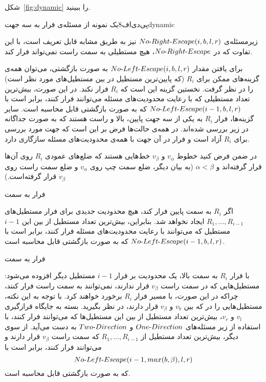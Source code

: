 
شکل~\ref{fig:dynamic} را ببینید.

‌پی‌دی‌اف{8}{یک نمونه از مسئله‌ی فرار به سه جهت}{dynamic}

زیر‌مسئله‌ی $No \mbox{-} Right \mbox{-} Escape(i, b, l, r)$ نیز به طریق مشابه قابل تعریف است، با این تفاوت که در $No \mbox{-} Right \mbox{-} Escape$، هیچ مستطیلی به سمت راست نمی‌تواند فرار کند.


برای یافتن مقدار $No \mbox{-} Left \mbox{-} Escape(i, b, l, r)$ به صورت بازگشتی، می‌توان همه‌ی گزینه‌های ممکن برای $R_{i}$ (که پایین‌ترین مستطیل در بین مستطیل‌های مورد نظر است) را در نظر گرفت. نخستین گزینه این است که $R_{i}$ فرار نکند. در این صورت، بیش‌ترین تعداد مستطیلی که با رعایت محدودیت‌های مسئله می‌توانند فرار کنند، برابر است با $No \mbox{-} Left \mbox{-} Escape(i - 1, b, l, r)$ که به صورت بازگشتی قابل محاسبه است. سایر گزینه‌ها، فرار $R_{i}$ به یکی از سه جهت پایین، بالا و راست هستند که به صورت جداگانه در زیر بررسی شده‌اند. در همه‌ی حالت‌ها فرض بر این است که جهت مورد بررسی برای $R_{i}$ آزاد است و فرار در آن جهت با همه‌ی محدودیت‌های مسئله سازگاری دارد.

در ضمن فرض کنید خطوط $v_{\alpha}$ و $v_{\beta}$ خط‌هایی هستند که ضلع‌های عمودی $R_{i}$ روی آن‌ها قرار گرفته‌اند و $\alpha < \beta$ (به بیان دیگر، ضلع سمت چپ روی $v_{\alpha}$ و ضلع سمت راست روی $v_{\beta}$ قرار گرفته‌است.)


 فرار به سمت 

اگر $R_{i}$ به سمت پایین فرار کند، هیچ محدودیت جدیدی برای فرار مستطیل‌های $R_{1}, \ldots, R_{i - 1}$ ایجاد نخواهد شد. بنابراین، بیش‌ترین تعداد مستطیل از بین این $i - 1$ مستطیل که می‌توانند با رعایت محدودیت‌های مسئله فرار کنند، برابر است با $No \mbox{-} Left \mbox{-} Escape(i - 1, b, l, r)$ که به صورت بازگشتی قابل محاسبه است.

 فرار به سمت 

با فرار $R_{i}$ به سمت بالا، یک محدودیت بر فرار $i - 1$ مستطیل دیگر افزوده می‌شود: مستطیل‌هایی که در سمت راست $v_{\beta}$ قرار ندارند، نمی‌توانند به سمت راست فرار کنند، چراکه در این صورت، با مسیر فرار $R_{i}$ برخورد خواهند کرد. با توجه به این نکته، مستطیل‌هایی را در که بین $v_{b}$ و $v_{\beta}$ قرار دارند، در نظر بگیرید. بسته به جایگاه قرارگیری $v_l$ و $v_r$، بیش‌ترین تعداد مستطیل از بین این مستطیل‌ها که می‌توانند فرار کنند، با استفاده از زیر مسئله‌های $One \mbox{-} Direction$ و $Two \mbox{-} Direction$ به دست می‌آید. از سوی دیگر، بیش‌ترین تعداد مستطیل از $R_{1}, \ldots, R_{i - 1}$ که سمت راست $v_{\beta}$ قرار دارند و می‌توانند فرار کنند، برابر است با
$$No \mbox{-} Left \mbox{-} Escape(i - 1, max(b, \beta), l, r)$$
که به صورت بازگشتی قابل محاسبه است.

